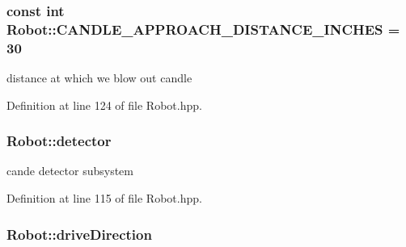 \hypertarget{classRobot_a59c0d01f9863b7c1e504b558bd9fae67}{
\subsubsection[{C\-A\-N\-D\-L\-E\-\_\-\-A\-P\-P\-R\-O\-A\-C\-H\-\_\-\-D\-I\-S\-T\-A\-N\-C\-E\-\_\-\-I\-N\-C\-H\-E\-S}]{\setlength{\rightskip}{0pt plus 5cm}const int Robot\-::\-C\-A\-N\-D\-L\-E\-\_\-\-A\-P\-P\-R\-O\-A\-C\-H\-\_\-\-D\-I\-S\-T\-A\-N\-C\-E\-\_\-\-I\-N\-C\-H\-E\-S = 30\hspace{0.3cm}{\ttfamily [static]}}}\label{classRobot_a59c0d01f9863b7c1e504b558bd9fae67}


distance at which we blow out candle 



Definition at line 124 of file Robot.\-hpp.

\hypertarget{classRobot_a19cb4c2ee87b595db9275e6b3d9ca30d}{
\subsubsection[{detector}]{ Robot\-::detector}}\label{classRobot_a19cb4c2ee87b595db9275e6b3d9ca30d}


cande detector subsystem 



Definition at line 115 of file Robot.\-hpp.

\hypertarget{classRobot_af15d2eaa46a9736e5d3d3aa9e8a9751c}{
\subsubsection[{drive\-Direction}]{ Robot\-::drive\-Direction\hspace{0.3cm}{\ttfamily [private]}}}\label{classRobot_af15d2eaa46a9736e5d3d3aa9e8a9751c}


